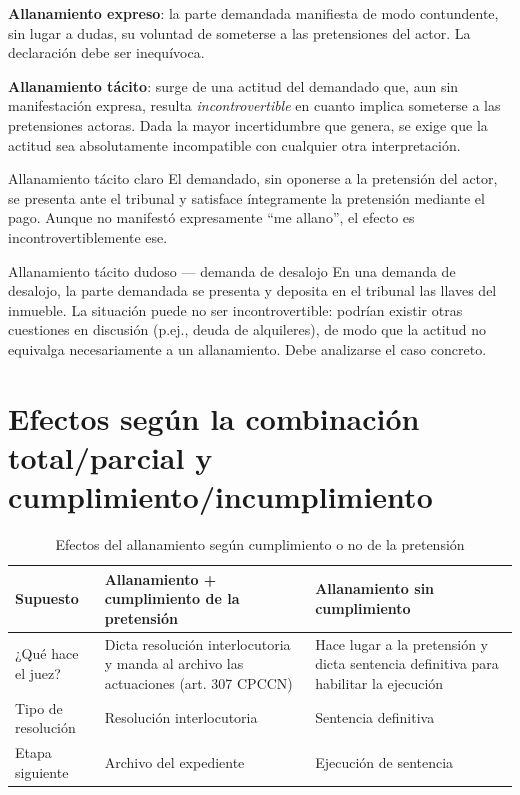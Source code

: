 \documentclass[12pt,oneside]{book}
\begin{document}
\textbf{Allanamiento expreso}: la parte demandada manifiesta de modo contundente, sin lugar a dudas, su voluntad de someterse a las pretensiones del actor. La declaración debe ser inequívoca.

\textbf{Allanamiento tácito}: surge de una actitud del demandado que, aun sin manifestación expresa, resulta \emph{incontrovertible} en cuanto implica someterse a las pretensiones actoras. Dada la mayor incertidumbre que genera, se exige que la actitud sea absolutamente incompatible con cualquier otra interpretación.

\begin{example}{Allanamiento tácito claro}
El demandado, sin oponerse a la pretensión del actor, se presenta ante el tribunal y satisface íntegramente la pretensión mediante el pago. Aunque no manifestó expresamente ``me allano'', el efecto es incontrovertiblemente ese.
\end{example}

\begin{example}{Allanamiento tácito dudoso --- demanda de desalojo}
En una demanda de desalojo, la parte demandada se presenta y deposita en el tribunal las llaves del inmueble. La situación puede no ser incontrovertible: podrían existir otras cuestiones en discusión (p.ej., deuda de alquileres), de modo que la actitud no equivalga necesariamente a un allanamiento. Debe analizarse el caso concreto.
\end{example}

\section{Efectos según la combinación total/parcial y cumplimiento/incumplimiento}

\begin{table}[H]
\centering
\begin{tabularx}{\textwidth}{
    >{\raggedright\arraybackslash}p{}
    >{\raggedright\arraybackslash}X
    >{\raggedright\arraybackslash}X
}
\toprule
\textbf{Supuesto} & \textbf{Allanamiento + cumplimiento de la pretensión} & \textbf{Allanamiento sin cumplimiento} \\
\midrule
¿Qué hace el juez? & Dicta resolución interlocutoria y manda al archivo las actuaciones (art. 307 CPCCN) & Hace lugar a la pretensión y dicta sentencia definitiva para habilitar la ejecución \\
\addlinespace
Tipo de resolución & Resolución interlocutoria & Sentencia definitiva \\
\addlinespace
Etapa siguiente & Archivo del expediente & Ejecución de sentencia \\
\bottomrule
\end{tabularx}
\caption{Efectos del allanamiento según cumplimiento o no de la pretensión}
\end{table}
\end{document}
